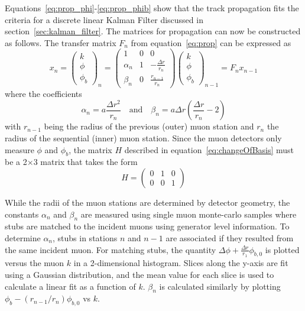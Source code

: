 Equations~\ref{eq:prop_phi}-\ref{eq:prop_phib} show that the track propagation fits the criteria for a discrete linear Kalman Filter discussed in section~\ref{sec:kalman_filter}. The matrices for propagation can now be constructed as follows. The transfer matrix $F_n$ from equation~\ref{eq:prop} can be expressed as
\begin{equation}
	\label{eq:kmtfProp}
	x_{n}=\left(\begin{matrix}
		k\\
		\phi\\
		\phi_b
	\end{matrix}\right)_{n} = 
\left(\begin{matrix}
	1 & 0 & 0\\
	\alpha_n & 1 & -\frac{\Delta r}{r_n}\\
	\beta_n & 0 & \frac{r_{n-1}}{r_n}
\end{matrix}\right)
\left(\begin{matrix}
	k\\
	\phi\\
	\phi_b
\end{matrix}\right)_{n-1}=F_nx_{n-1}
\end{equation}
where the coefficients
\begin{equation}
	\label{eq:kmtf_coeff}
	\alpha_n=a\frac{\Delta r^2}{r_n} \quad \mathrm{and} \quad \beta_n=a\Delta r\left(\frac{\Delta r}{r_n}-2\right)
\end{equation}
with $r_{n-1}$ being the radius of the previous (outer) muon station and $r_n$ the radius of the sequential (inner) muon station. Since the muon detectors only measure $\phi$ and $\phi_b$, the matrix $H$ described in equation~\ref{eq:changeOfBasis} must be a 2$\times$3 matrix that takes the form
\begin{equation}
	H=\left(\begin{matrix}
		0 & 1 & 0\\
		0 & 0 & 1\end{matrix}\right)
\end{equation}

While the radii of the muon stations are determined by detector geometry, the constants $\alpha_n$ and $\beta_n$ are measured using single muon monte-carlo samples where stubs are matched to the incident muons using generator level information. To determine $\alpha_n$, stubs in stations $n$ and $n-1$ are associated if they resulted from the same incident muon. For matching stubs, the quantity $\Delta\phi+\frac{\Delta r}{r_1}\phi_{b,0}$ is plotted versus the muon $k$ in a 2-dimensional histogram. Slices along the y-axis are fit using a Gaussian distribution, and the mean value for each slice is used to calculate a linear fit as a function of $k$. $\beta_n$ is calculated similarly by plotting $\phi_b-\left(r_{n-1}/r_n\right)\phi_{b,0}$ vs $k$.

